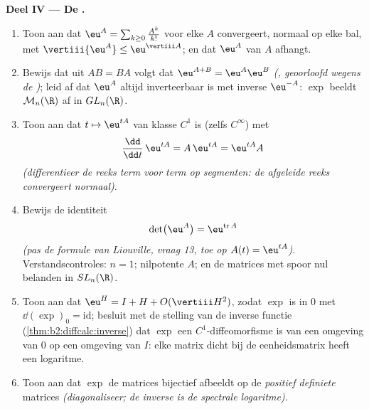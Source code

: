 \begin{problem}
\medskip
\noindent\textbf{Deel IV --- De .}
\begin{enumerate}[resume]
  \item Toon aan dat $\eu^A = \sum_{k\geq0}\frac{A^k}{k!}$ voor
        elke $A$  convergeert, normaal op elke bal, met
        $\vertiii{\eu^A} \leq \eu^{\vertiii A}$; en dat $\eu^A$
         van $A$ afhangt.
  \item Bewijs dat uit $AB = BA$ volgt dat $\eu^{A+B} =
        \eu^A\eu^B$ \emph{(, geoorloofd wegens de
        )}; leid af dat $\eu^A$ altijd
        inverteerbaar is met inverse $\eu^{-A}$: $\exp$ beeldt
        $\mathcal M_n(\R)$ af in $GL_n(\R)$.
  \item Toon aan dat $t \mapsto \eu^{tA}$ van klasse $C^1$ is
        (zelfs $C^\infty$) met
        \[
        \frac{\dd}{\dd t}\,\eu^{tA} = A\,\eu^{tA} =
        \eu^{tA}A
        \]
        \emph{(differentieer de reeks term voor term op
        segmenten: de afgeleide reeks convergeert normaal)}.
  \item Bewijs de identiteit
        \[
        \det\bigl(\eu^{A}\bigr) = \eu^{\operatorname{tr}A}
        \]
        \emph{(pas de formule van Liouville, vraag 13, toe op
        $A(t) = \eu^{tA}$)}. Verstandscontroles: $n = 1$;
        nilpotente $A$; en de matrices met spoor nul belanden in
        $SL_n(\R)$.
  \item Toon aan dat $\eu^H = I + H + O(\vertiii H^2)$, zodat
        $\exp$  is in $0$ met $\dd(\exp)_0 =
        \mathrm{id}$; besluit met de stelling van de inverse
        functie (\cref{thm:b2:diffcalc:inverse}) dat $\exp$ een
        $C^1$-diffeomorfisme is van een omgeving van $0$ op een
        omgeving van $I$: elke matrix dicht bij de eenheidsmatrix
        heeft een logaritme.
  \item Toon aan dat $\exp$ de  matrices bijectief
        afbeeldt op de  \emph{positief definiete}
        matrices \emph{(diagonaliseer; de inverse is de spectrale
        logaritme)}.
\end{enumerate}


\end{problem}

